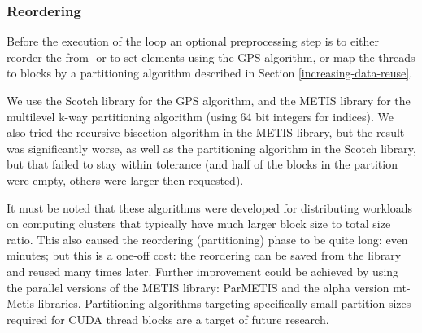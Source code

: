 \subsubsection{Reordering}

Before the execution of the loop an optional preprocessing step is to either
reorder the from- or to-set elements using the GPS algorithm, or map the threads
to blocks by a partitioning algorithm described in Section
\ref{increasing-data-reuse}.

We use the Scotch library\cite{scotch} for the GPS algorithm, and the
METIS\cite{metis} library for the multilevel k-way partitioning algorithm (using
64 bit integers for indices). We also tried the recursive bisection algorithm in
the METIS library, but the result was significantly worse, as well as the
partitioning algorithm in the Scotch library, but that failed to stay within
tolerance (and half of the blocks in the partition were empty, others were
larger then requested).

It must be noted that these algorithms were developed for distributing workloads
on computing clusters that typically have much larger block size to total size
ratio. This also caused the reordering (partitioning) phase to be quite long:
even minutes; but this is a one-off cost: the reordering can be saved from the
library and reused many times later. Further improvement could be achieved by
using the parallel versions of the METIS library: ParMETIS\cite{parmetis} and
the alpha version mt-Metis\cite{mtmetis} libraries. Partitioning algorithms
targeting specifically small partition sizes required for CUDA thread blocks are
a target of future research.

